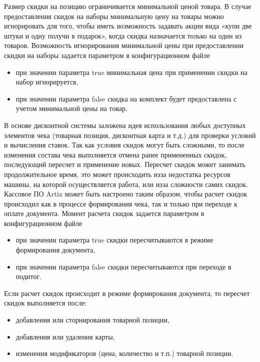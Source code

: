 \documentclass[a4paper,10pt,russian]{report}
\begin{document}
\sphinxAtStartPar
Размер скидки на позицию ограничивается минимальной ценой товара. В случае предоставления скидок на наборы минимальную цену
на товары можно игнорировать для того, чтобы иметь возможность задавать акции вида «купи две штуки и одну получи в подарок»,
когда скидка назначается только на один из товаров. Возможность игнорирования минимальной цены при предоставлении скидки
на наборы задается параметром  в конфигурационном файле 
\begin{itemize}
\item {} 
\sphinxAtStartPar
при значении параметра true минимальная цена при применении скидки на набор игнорируется,

\item {} 
\sphinxAtStartPar
при значении параметра false скидка на комплект будет предоставлена с учетом минимальной цены на товар.

\end{itemize}

\sphinxAtStartPar
В основе дисконтной системы заложена идея использования любых доступных элементов чека (товарная позиция, дисконтная карта и т.д.)
для проверки условий и вычисления ставок. Так как условия скидок могут быть сложными, то после изменения состава чека выполняется
отмена ранее примененных скидок, последующий пересчет и применение новых. Пересчет скидок может занимать продолжительное время,
это может происходить из\sphinxhyphen{}за недостатка ресурсов машины, на которой осуществляется работа, или из\sphinxhyphen{}за сложности самих скидок.
Кассовое ПО Artix может быть настроено таким образом, чтобы расчет скидок происходил как в процессе формирования чека,
так и только при переходе к оплате документа. Момент расчета скидок задается параметром 
в конфигурационном файле 
\begin{itemize}
\item {} 
\sphinxAtStartPar
при значении параметра true скидки пересчитываются в режиме формирования документа,

\item {} 
\sphinxAtStartPar
при значении параметра false скидки пересчитываются при переходе в подитог.

\end{itemize}

\sphinxAtStartPar
Если расчет скидок происходит в режиме формирования документа, то пересчет скидок выполняется после:
\begin{itemize}
\item {} 
\sphinxAtStartPar
добавления или сторнирования товарной позиции,

\item {} 
\sphinxAtStartPar
добавления или удаления карты,

\item {} 
\sphinxAtStartPar
изменения модификаторов (цена, количество и т.п.) товарной позиции.

\end{itemize}
\end{document}
